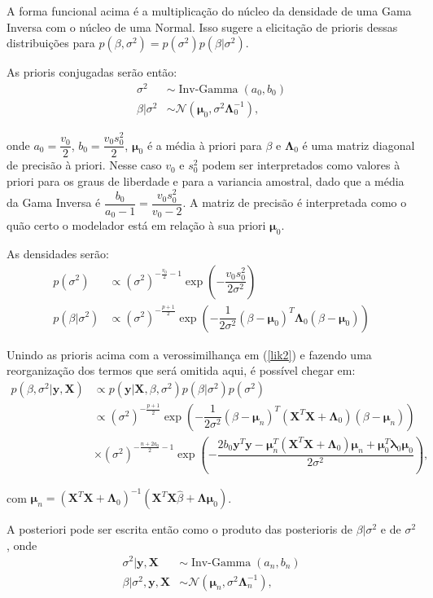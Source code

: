 \documentclass[12pt,letterpaper]{article}
\newcommand{\bd}[1]{\boldsymbol{#1}}
\newcommand{\op}{\operatorname}
\newcommand{\norm}{\mathcal{N}}
\begin{document}
	A forma funcional acima é a multiplicação do núcleo da densidade de uma Gama Inversa com o núcleo de uma Normal. Isso sugere a elicitação de prioris dessas distribuições para $p(\beta,\sigma^2)=p(\sigma^2)p(\beta|\sigma^2)$. 
	
	As prioris conjugadas serão então:
	\begin{align}
		\sigma^2& \sim\op{Inv-Gamma}(a_0,b_0)\label{priors2}\\
		\beta|\sigma^2&\sim \norm(\bd\mu_0,\sigma^2\bd\Lambda_0^{-1})\label{priorbs},
	\end{align}
	
	onde $a_0=\dfrac{v_0}{2}$, $b_0=\dfrac{v_0s_0^2}{2}$, $\bd \mu_0$ é a média à priori para $\beta$ e $\bd\Lambda_0$ é uma matriz diagonal de precisão à priori. Nesse caso $v_0$ e $s_0^2$ podem ser interpretados como valores à priori para os graus de liberdade e para a variancia amostral, dado que a média da Gama Inversa é $\dfrac{b_0}{a_0-1}=\dfrac{v_0s_0^2}{v_0-2}$. A matriz de precisão é interpretada como o quão certo o modelador está em relação à sua priori $\bd\mu_0$.
	
	As densidades serão:
	\begin{align*}
		p(\sigma^2)&\propto(\sigma^2)^{-\frac{v_0}2-1}\exp\left(-\dfrac{v_0s_0^2}{2\sigma^2}\right)\\
		p(\beta|\sigma^2)&\propto(\sigma^2)^{-\frac{p+1}{2}}\exp\left(-\dfrac{1}{2\sigma^2}(\beta-\bd\mu_0)^T\bd\Lambda_0(\beta-\bd\mu_0)\right)
	\end{align*}

	Unindo as prioris acima com a verossimilhança em (\ref{lik2}) e fazendo uma reorganização dos termos que será omitida aqui, é possível chegar em:
	\begin{align*}
		p(\beta,\sigma^2|\bd y,\bd X)&\propto p(\bd y|\bd X,\beta,\sigma^2)p(\beta|\sigma^2)p(\sigma^2)\\
		&\propto(\sigma^2)^{-\frac{p+1}{2}}\exp\left(-\dfrac{1}{2\sigma^2}(\beta-\bd\mu_n)^T(\bd X^T\bd X+\bd\Lambda_0)(\beta-\bd\mu_n)\right)\\
		&\times(\sigma^2)^{-\frac{n+2a_0}{2}-1}\exp\left(-\dfrac{2b_0\bd y^T\bd y-\bd \mu_n^T(\bd X^T\bd X+\bd\Lambda_0)\bd\mu_ n+\bd\mu_0^T\bd\lambda_0\bd\mu_0}{2\sigma^2}\right),
	\end{align*}

	com $\bd\mu_n=(\bd X^T\bd X+\bd\Lambda_0)^{-1}(\bd X^T\bd X\hat\beta+\bd\Lambda\bd\mu_0)$.
	
	A posteriori pode ser escrita então como o produto das posterioris de $\beta|\sigma^2$ e de $\sigma^2$, onde
	\begin{align*}\sigma^2|\bd y,\bd X&\sim \op{Inv-Gamma}(a_n,b_n)\\
		\beta|\sigma^2,\bd y,\bd X &\sim \norm(\bd\mu_n,\sigma^2\bd\Lambda_n^{-1}),		
	\end{align*}
	
\end{document}

